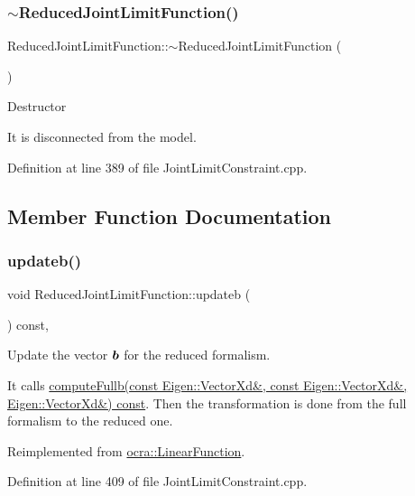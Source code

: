 \subsubsection{\texorpdfstring{$\sim$\+Reduced\+Joint\+Limit\+Function()}{~ReducedJointLimitFunction()}}
{\footnotesize\ttfamily Reduced\+Joint\+Limit\+Function\+::$\sim$\+Reduced\+Joint\+Limit\+Function (\begin{DoxyParamCaption}{ }\end{DoxyParamCaption})}

Destructor

It is disconnected from the model. 

Definition at line 389 of file Joint\+Limit\+Constraint.\+cpp.



\subsection{Member Function Documentation}
\hypertarget{classocra_1_1ReducedJointLimitFunction_aaf30e3ac7c3053707a04a147b545126c}{}\label{classocra_1_1ReducedJointLimitFunction_aaf30e3ac7c3053707a04a147b545126c} 
\subsubsection{\texorpdfstring{updateb()}{updateb()}}
{\footnotesize\ttfamily void Reduced\+Joint\+Limit\+Function\+::updateb (\begin{DoxyParamCaption}{ }\end{DoxyParamCaption}) const\hspace{0.3cm}{\ttfamily [protected]}, {\ttfamily [virtual]}}

Update the vector $ \mbox{\boldmath${b}$} $ for the reduced formalism.

It calls \hyperlink{classocra_1_1JointLimitFunction_a254ef5b5095410a802976c95f04fe0a4}{compute\+Fullb(const Eigen\+::\+Vector\+Xd\&, const Eigen\+::\+Vector\+Xd\&, Eigen\+::\+Vector\+Xd\&) const}. Then the transformation is done from the full formalism to the reduced one. 

Reimplemented from \hyperlink{classocra_1_1LinearFunction_a546454cd8d0909f99433ffc0e700c9e3}{ocra\+::\+Linear\+Function}.



Definition at line 409 of file Joint\+Limit\+Constraint.\+cpp.

